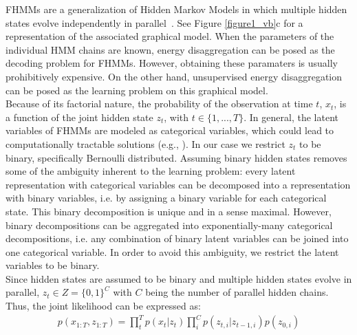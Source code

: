 FHMMs are a generalization of Hidden Markov Models in which multiple hidden states evolve independently in parallel~\cite{ghahramani1996factorial}. See Figure \ref{figure1_vb}c for a representation of the associated graphical model. When the parameters of the individual HMM chains are known, energy disaggregation can be posed as the decoding problem for FHMMs. However, obtaining these paramaters is usually prohibitively expensive. On the other hand, unsupervised energy disaggregation can be posed as the learning problem on this graphical model.\\
Because of its factorial nature, the probability of the observation at time $t$, $x_t$, is a function of the joint hidden state $z_t$, with $t \in \{1,...,T\}$. In general, the latent variables of FHMMs are modeled as categorical variables, which could lead to computationally tractable solutions (e.g., \cite{jang2016categorical}). In our case we restrict $z_t$ to be binary, specifically Bernoulli distributed. Assuming binary hidden states removes some of the ambiguity inherent to the learning problem: every latent representation with categorical variables can be decomposed into a representation with binary variables, i.e. by assigning a binary variable for each categorical state. This binary decomposition is unique and in a sense maximal. However, binary decompositions can be aggregated into exponentially-many categorical decompositions, i.e. any combination of binary latent variables can be joined into one categorical variable. In order to avoid this ambiguity, we restrict the latent variables to be binary.\\
Since hidden states are assumed to be binary and multiple hidden states evolve in parallel, $z_t \in Z  = \{0,1\}^C$ with $C$ being the number of parallel hidden chains. Thus, the joint likelihood can be expressed as:
\begin{align}
p(x_{1:T},z_{1:T}) = \prod_t^T p(x_t|z_t)\prod_i^C p(z_{t,i}|z_{t-1,i})p(z_{0,i})
\end{align}

